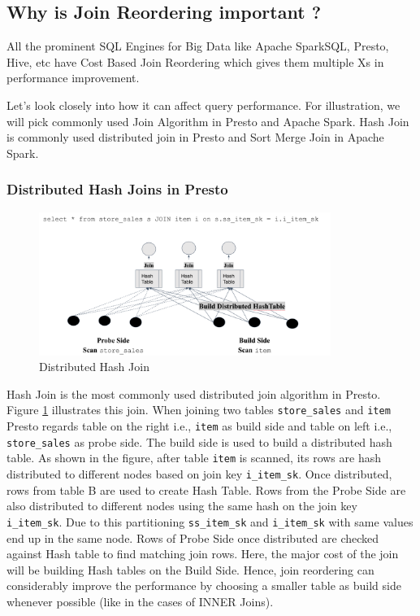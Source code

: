 \subsection{Why is Join Reordering important ?}
All the prominent SQL Engines for Big Data like Apache SparkSQL, Presto, Hive, etc have Cost Based Join Reordering which gives them multiple Xs in performance improvement\cite{b2}.

Let's look closely into how it can affect query performance. For illustration, we will pick commonly used Join Algorithm in Presto and Apache Spark. Hash Join is commonly used distributed join in Presto and Sort Merge Join in Apache Spark.

\subsubsection{Distributed Hash Joins in Presto}

\begin{figure}[ht]
\centerline{\includegraphics[width=9.5cm]{fig/DistributedHashJoin.png}}
\caption{Distributed Hash Join}
\label{distributed_hash_join}
\end{figure}

Hash Join is the most commonly used distributed join algorithm in Presto.
Figure \ref{distributed_hash_join} illustrates this join.
When joining two tables \texttt{store\_sales} and \texttt{item} Presto regards table on the right i.e., \texttt{item}  as build side and table on left i.e., \texttt{store\_sales} as probe side.
The build side is used to build a distributed hash table. As shown in the figure, after table \texttt{item} is scanned, its rows are hash distributed to different nodes based on join key \texttt{i\_item\_sk}. Once distributed, rows from table B are used to create Hash Table. Rows from the Probe Side are also distributed to different nodes using the same hash on the join key \texttt{i\_item\_sk}. Due to this partitioning \texttt{ss\_item\_sk}  and \texttt{i\_item\_sk} with same values end up in the same node.  Rows of Probe Side once distributed are checked against Hash table to find matching join rows. Here, the major cost of the join will be building Hash tables on the Build Side. Hence, join reordering can considerably improve the performance by choosing a smaller table as build side whenever possible (like in the cases of INNER Joins).

